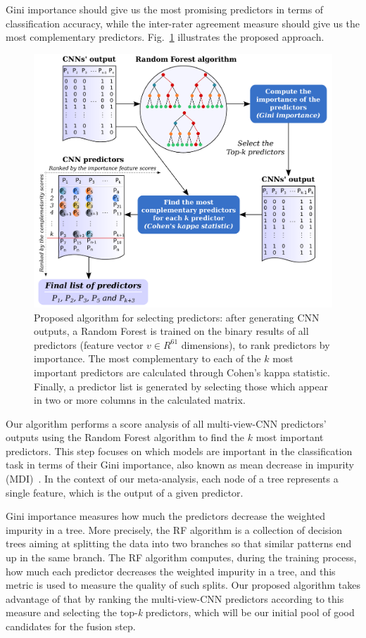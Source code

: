 Gini importance should give us the most promising predictors in terms of classification accuracy, while the inter-rater agreement measure should give us the most complementary predictors. Fig.~\ref{fig:proposed_method_selection} illustrates the proposed approach.
%
\begin{figure}[t]
\centering
    \includegraphics[width=0.99\linewidth]{graphics/selection-algo-v2.pdf}
    \caption{Proposed algorithm for selecting predictors: after generating CNN outputs, a Random Forest is trained on the binary results of all predictors (feature vector $v \in R^{61}$ dimensions), to rank predictors by importance. The most complementary to each of the $k$ most important predictors are calculated through Cohen's kappa statistic. Finally, a predictor list is generated by selecting those which appear in two or more columns in the calculated matrix.}
\label{fig:proposed_method_selection}
\end{figure}

Our algorithm performs a score analysis of all multi-view-CNN predictors' outputs using the Random Forest algorithm to find the $k$ most important predictors. This step focuses on which models are important in the classification task in terms of their {Gini} importance, also known as mean decrease in impurity (MDI)~\cite{Breiman:1984}. In the context of our meta-analysis, each node of a tree represents a single feature, which is the output of a given predictor.

{Gini} importance measures how much the predictors decrease the weighted impurity in a tree. More precisely, the RF algorithm is a collection of decision trees aiming at splitting the data into two branches so that similar patterns end up in the same branch. The RF algorithm computes, during the training process, how much each predictor decreases the weighted impurity in a tree, and this metric is used to measure the quality of such splits. Our proposed algorithm takes advantage of that by ranking the multi-view-CNN predictors according to this measure and selecting the top-\textit{k} predictors, which will be our initial pool of good candidates for the fusion step.

